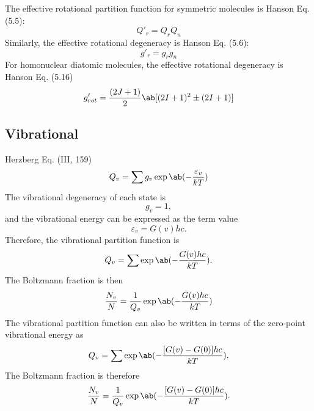 \documentclass[11pt, twoside, fleqn]{report}
\begin{document}
    The effective rotational partition function for symmetric molecules is Hanson Eq. (5.5):
    \begin{equation*}
        Q'_{r} = Q_{r}Q_{n}
    \end{equation*}
    Similarly, the effective rotational degeneracy is Hanson Eq. (5.6):
    \begin{equation*}
        g'_{r} = g_{r}g_{n}
    \end{equation*}
    For homonuclear diatomic molecules, the effective rotational degeneracy is Hanson Eq. (5.16)
    \begin{equation*}
        g'_{rot} = \frac{(2J + 1)}{2}\ab[(2I + 1)^{2} \pm (2I + 1)]
    \end{equation*}

    \subsection{Vibrational}

    Herzberg Eq. (III, 159)
    \begin{equation*}
        Q_{v} = \sum g_{v}\exp\ab(-\frac{\varepsilon_{v}}{kT})
    \end{equation*}
    The vibrational degeneracy of each state is
    \begin{equation*}
        g_{v} = 1,
    \end{equation*}
    and the vibrational energy can be expressed as the term value
    \begin{equation*}
        \varepsilon_{v} = G(v)hc.
    \end{equation*}
    Therefore, the vibrational partition function is
    \begin{equation*}
        Q_{v} = \sum \exp\ab(-\frac{G(v)hc}{kT}).
    \end{equation*}
    The Boltzmann fraction is then
    \begin{equation*}
        \frac{N_{v}}{N} = \frac{1}{Q_{v}}\exp\ab(-\frac{G(v)hc}{kT})
    \end{equation*}
    The vibrational partition function can also be written in terms of the zero-point vibrational energy as
    \begin{equation*}
        Q_{v} = \sum \exp\ab(-\frac{[G(v) - G(0)]hc}{kT}).
    \end{equation*}
    The Boltzmann fraction is therefore
    \begin{equation*}
        \frac{N_{v}}{N} = \frac{1}{Q_{v}}\exp\ab(-\frac{[G(v) - G(0)]hc}{kT}).
    \end{equation*}
\end{document}
